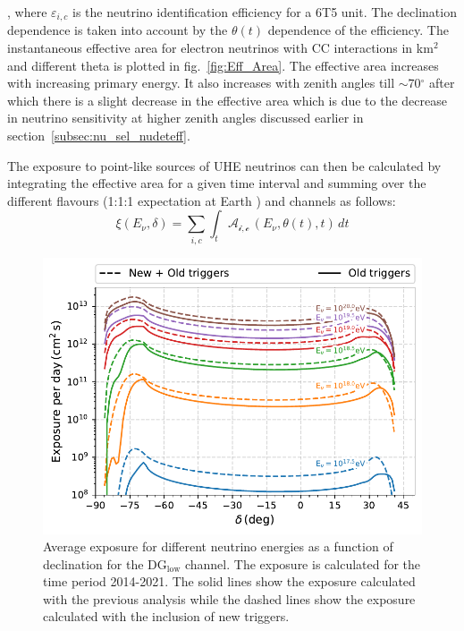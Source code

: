 , where $\varepsilon_{i,c}$ is the neutrino identification efficiency for a 6T5 unit. The declination dependence is taken into account by the $\theta(t)$ dependence of the efficiency. The instantaneous effective area for electron neutrinos with CC interactions in km$^2$ and different theta is plotted in fig.~\ref{fig:Eff_Area}. The effective area increases with increasing primary energy. It also increases with zenith angles till $\sim$70$^\circ$ after which there is a slight decrease in the effective area which is due to the decrease in neutrino sensitivity at higher zenith angles discussed earlier in section~\ref{subsec:nu_sel_nudeteff}. 

The exposure to point-like sources of UHE neutrinos can then be calculated by integrating the effective area for a given time interval and summing over the different flavours (1:1:1 expectation at Earth ) and channels as follows:
\begin{equation}
  \label{eq:exposure_point}
  \xi(E_{\nu}, \delta) = \sum_{i,c} \int_{t} \mathcal{A_{i,c}} \, (E_{\nu},\theta(t),t) \, dt
\end{equation}


\begin{figure}[t!]
  \centering
  \includegraphics[width=\textwidth]{thesis_figures/PointLimits/Exposure_vs_Dec.pdf}
  \caption{Average exposure for different neutrino energies as a function of declination for the DG$\mathrm{_{\text{low}}}$ channel. The exposure is calculated for the time period 2014-2021. The solid lines show the exposure calculated with the previous analysis while the dashed lines show the exposure calculated with the inclusion of new triggers.}
  \label{fig:Exp_dec}
\end{figure}

